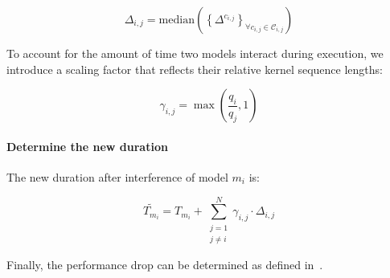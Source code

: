 $$
	\Delta_{i,j} = \text{median}\left(\left\{ \Delta^{c_{i,j}} \right\}_{\forall c_{i,j} \in \mathcal{C}_{i,j}}\right)
$$

To account for the amount of time two models interact during execution, we introduce a scaling factor that reflects their relative kernel sequence lengths:

$$
	\gamma_{i,j} = \max\left(\frac{q_i}{q_j}, 1\right)
$$

\paragraph{Determine the new duration} The new duration after interference of model $m_i$ is:

$$
	\tilde{T_{m_i}} = T_{m_i} + \sum_{\substack{j=1 \\ j \neq i}}^{N} \gamma_{i,j} \cdot \Delta_{i,j}
$$

Finally, the performance drop can be determined as defined in~.






